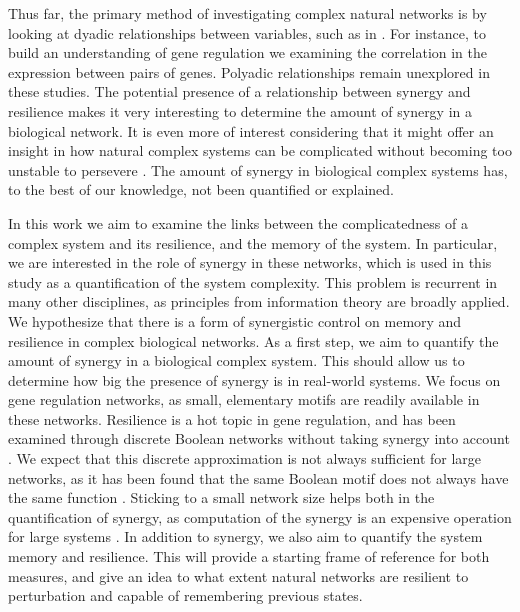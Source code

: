 \documentclass[../main.tex]{subfiles}
\begin{document}
Thus far, the primary method of investigating complex natural networks is by looking at dyadic relationships between variables, such as in \cite{ideker2001integrated, lu2004gene, tononi1999measures}.
For instance, to build an understanding of gene regulation we examining the correlation in the expression between pairs of genes.
Polyadic relationships remain unexplored in these studies.
The potential presence of a relationship between synergy and resilience makes it very interesting to determine the amount of synergy in a biological network.
It is even more of interest considering that it might offer an insight in how natural complex systems can be complicated without becoming too unstable to persevere \cite{macarthur1955fluctuations, kondoh2003foraging}.
The amount of synergy in biological complex systems has, to the best of our knowledge, not been quantified or explained.

In this work we aim to examine the links between the complicatedness of a complex system and its resilience, and the memory of the system.
In particular, we are interested in the role of synergy in these networks, which is used in this study as a quantification of the system complexity.
This problem is recurrent in many other disciplines, as principles from information theory are broadly applied.
We hypothesize that there is a form of synergistic control on memory and resilience in complex biological networks.
As a first step, we aim to quantify the amount of synergy in a biological complex system.
This should allow us to determine how big the presence of synergy is in real-world systems.
We focus on gene regulation networks, as small, elementary motifs are readily available in these networks.
Resilience is a hot topic in gene regulation, and has been examined through discrete Boolean networks without taking synergy into account \cite{peixoto2012emergence}.
We expect that this discrete approximation is not always sufficient for large networks, as it has been found that the same Boolean motif does not always have the same function \cite{ingram2006network}.
Sticking to a small network size helps both in the quantification of synergy, as computation of the synergy is an expensive operation for large systems \cite{jointpdf}.
In addition to synergy, we also aim to quantify the system memory and resilience.
This will provide a starting frame of reference for both measures, and give an idea to what extent natural networks are resilient to perturbation and capable of remembering previous states.
\end{document}
